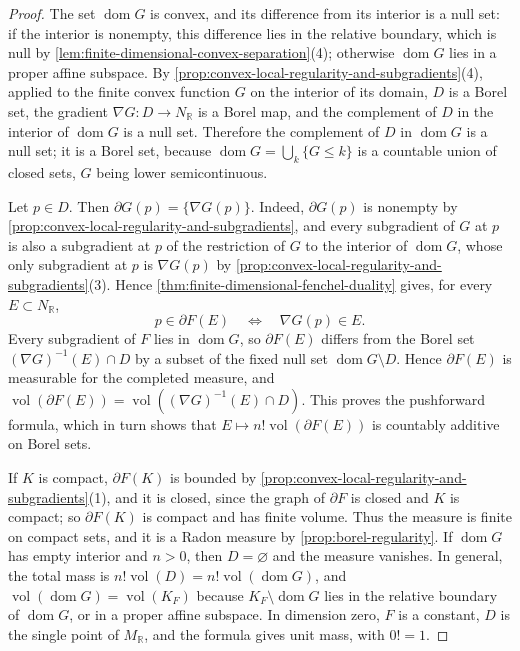\begin{proof}
The set $\operatorname{dom}G$ is convex, and its difference from its interior is a null set: if the interior is nonempty, this difference lies in the relative boundary, which is null by \cref{lem:finite-dimensional-convex-separation}(4); otherwise $\operatorname{dom}G$ lies in a proper affine subspace. By \cref{prop:convex-local-regularity-and-subgradients}(4), applied to the finite convex function $G$ on the interior of its domain, $D$ is a Borel set, the gradient $\nabla G\colon D\to N_{\mathbb R}$ is a Borel map, and the complement of $D$ in the interior of $\operatorname{dom}G$ is a null set. Therefore the complement of $D$ in $\operatorname{dom}G$ is a null set; it is a Borel set, because $\operatorname{dom}G=\bigcup_k\{G\leq k\}$ is a countable union of closed sets, $G$ being lower semicontinuous.

Let $p\in D$. Then $\partial G(p)=\{\nabla G(p)\}$. Indeed, $\partial G(p)$ is nonempty by \cref{prop:convex-local-regularity-and-subgradients}, and every subgradient of $G$ at $p$ is also a subgradient at $p$ of the restriction of $G$ to the interior of $\operatorname{dom}G$, whose only subgradient at $p$ is $\nabla G(p)$ by \cref{prop:convex-local-regularity-and-subgradients}(3). Hence \cref{thm:finite-dimensional-fenchel-duality} gives, for every $E\subset N_{\mathbb R}$,
\[
 p\in\partial F(E)\quad\Longleftrightarrow\quad\nabla G(p)\in E.
\]
Every subgradient of $F$ lies in $\operatorname{dom}G$, so $\partial F(E)$ differs from the Borel set $(\nabla G)^{-1}(E)\cap D$ by a subset of the fixed null set $\operatorname{dom}G\setminus D$. Hence $\partial F(E)$ is measurable for the completed measure, and $\operatorname{vol}(\partial F(E))=\operatorname{vol}((\nabla G)^{-1}(E)\cap D)$. This proves the pushforward formula, which in turn shows that $E\mapsto n!\operatorname{vol}(\partial F(E))$ is countably additive on Borel sets.

If $K$ is compact, $\partial F(K)$ is bounded by \cref{prop:convex-local-regularity-and-subgradients}(1), and it is closed, since the graph of $\partial F$ is closed and $K$ is compact; so $\partial F(K)$ is compact and has finite volume. Thus the measure is finite on compact sets, and it is a Radon measure by \cref{prop:borel-regularity}. If $\operatorname{dom}G$ has empty interior and $n>0$, then $D=\varnothing$ and the measure vanishes. In general, the total mass is $n!\operatorname{vol}(D)=n!\operatorname{vol}(\operatorname{dom}G)$, and $\operatorname{vol}(\operatorname{dom}G)=\operatorname{vol}(K_F)$ because $K_F\setminus\operatorname{dom}G$ lies in the relative boundary of $\operatorname{dom}G$, or in a proper affine subspace. In dimension zero, $F$ is a constant, $D$ is the single point of $M_{\mathbb R}$, and the formula gives unit mass, with $0!=1$.
\end{proof}

